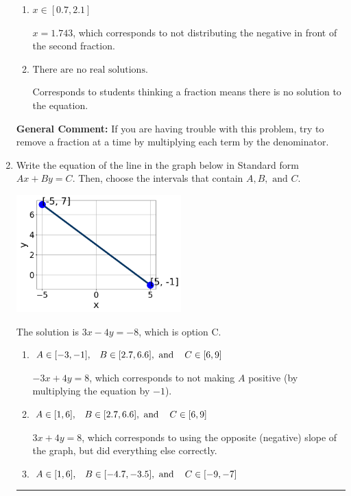 \documentclass{extbook}[14pt]
\newcommand{\litem}[1]{\item #1

\rule{\textwidth}{0.4pt}}
\begin{document}
\begin{enumerate}
{\begin{enumerate}[label=\Alph*.]
* $x = -2.279$, which is the correct option.
\item \( x \in [0.7, 2.1] \)

 $x = 1.743$, which corresponds to not distributing the negative in front of the second fraction.
\item \( \text{There are no real solutions.} \)

Corresponds to students thinking a fraction means there is no solution to the equation.
\end{enumerate}

\textbf{General Comment:} If you are having trouble with this problem, try to remove a fraction at a time by multiplying each term by the denominator.
}
\litem{
Write the equation of the line in the graph below in Standard form $Ax+By=C$. Then, choose the intervals that contain $A, B, \text{ and } C$.

\begin{center}
    \includegraphics[width=0.5\textwidth]{../Figures/linearGraphToStandardC.png}
\end{center}



The solution is \( 3x - 4y = -8 \), which is option C.\begin{enumerate}[label=\Alph*.]
\item \( A \in [-3, -1], \hspace{3mm} B \in [2.7, 6.6], \text{ and } \hspace{3mm} C \in [6, 9] \)

 $-3x + 4y = 8$, which corresponds to not making $A$ positive (by multiplying the equation by $-1$).
\item \( A \in [1, 6], \hspace{3mm} B \in [2.7, 6.6], \text{ and } \hspace{3mm} C \in [6, 9] \)

 $3x + 4y = 8$, which corresponds to using the opposite (negative) slope of the graph, but did everything else correctly.
\item \( A \in [1, 6], \hspace{3mm} B \in [-4.7, -3.5], \text{ and } \hspace{3mm} C \in [-9, -7] \)


\end{enumerate}}
\end{enumerate}
\end{document}
